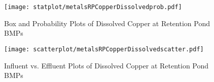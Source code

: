         \begin{figure}[hb]   %
            \centering
            \texttt{[image: statplot/metalsRPCopperDissolvedprob.pdf]}
            \caption{Box and Probability Plots of Dissolved Copper at Retention Pond BMPs}
        \end{figure}         %
        
        
        \begin{figure}[hb]   %
            \centering
            \texttt{[image: scatterplot/metalsRPCopperDissolvedscatter.pdf]}
            \caption{Influent vs. Effluent Plots of Dissolved Copper at Retention Pond BMPs}
        \end{figure}         %
        \clearpage
        